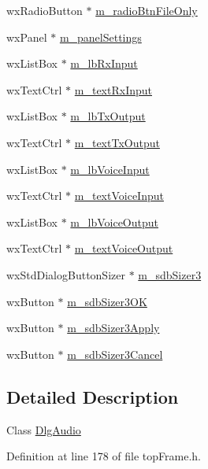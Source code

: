 \begin{DoxyCompactItemize}
\item 
wx\-Radio\-Button $\ast$ \hyperlink{class_dlg_audio_abbbc7d86cca84f89c78c16b9b6d3b793}{m\-\_\-radio\-Btn\-File\-Only}
\item 
wx\-Panel $\ast$ \hyperlink{class_dlg_audio_acfc12b7c79d7b058f6702d13d5663f70}{m\-\_\-panel\-Settings}
\item 
wx\-List\-Box $\ast$ \hyperlink{class_dlg_audio_a0690c3ab64ff5a74b476250f5f5ad490}{m\-\_\-lb\-Rx\-Input}
\item 
wx\-Text\-Ctrl $\ast$ \hyperlink{class_dlg_audio_a159d6689a03be5cd0f7fef25bba965fc}{m\-\_\-text\-Rx\-Input}
\item 
wx\-List\-Box $\ast$ \hyperlink{class_dlg_audio_a7a15f882dd0791867d7284cc4b043ca2}{m\-\_\-lb\-Tx\-Output}
\item 
wx\-Text\-Ctrl $\ast$ \hyperlink{class_dlg_audio_a9a7b73374404fee2e3ce1b742ce5e563}{m\-\_\-text\-Tx\-Output}
\item 
wx\-List\-Box $\ast$ \hyperlink{class_dlg_audio_a022070976a0bc9ffb78bea4298f759aa}{m\-\_\-lb\-Voice\-Input}
\item 
wx\-Text\-Ctrl $\ast$ \hyperlink{class_dlg_audio_a900d174fd432c0e70d6f3fccd24e723b}{m\-\_\-text\-Voice\-Input}
\item 
wx\-List\-Box $\ast$ \hyperlink{class_dlg_audio_a75f209f62dd213b4236624f019f611e1}{m\-\_\-lb\-Voice\-Output}
\item 
wx\-Text\-Ctrl $\ast$ \hyperlink{class_dlg_audio_a24ed8e4513996b1d938fbc6977d883a4}{m\-\_\-text\-Voice\-Output}
\item 
wx\-Std\-Dialog\-Button\-Sizer $\ast$ \hyperlink{class_dlg_audio_aa2834821c2fcae88fbedf3abfb9d69e0}{m\-\_\-sdb\-Sizer3}
\item 
wx\-Button $\ast$ \hyperlink{class_dlg_audio_a81c75edcacae099633853ee775d72de9}{m\-\_\-sdb\-Sizer3\-O\-K}
\item 
wx\-Button $\ast$ \hyperlink{class_dlg_audio_a2a6d0fffd35e01a0b59c22164625e6c3}{m\-\_\-sdb\-Sizer3\-Apply}
\item 
wx\-Button $\ast$ \hyperlink{class_dlg_audio_a749b04f8606ba939394d75267f8003ce}{m\-\_\-sdb\-Sizer3\-Cancel}
\end{DoxyCompactItemize}


\subsection{Detailed Description}
Class \hyperlink{class_dlg_audio}{Dlg\-Audio} 

Definition at line 178 of file top\-Frame.\-h.



